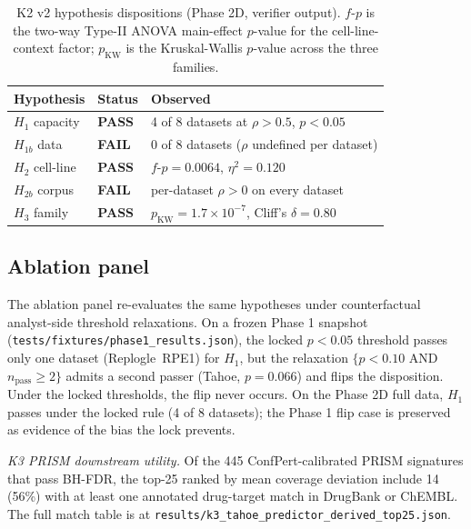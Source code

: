 \documentclass[11pt]{article}
\begin{document}
\begin{table}[h]
\centering
\caption{K2 v2 hypothesis dispositions (Phase 2D, verifier output).
$f$-$p$ is the two-way Type-II ANOVA main-effect $p$-value for the
cell-line-context factor; $p_\text{KW}$ is the Kruskal-Wallis $p$-value
across the three families.}
\label{tab:disp}
\begin{tabular}{lll}
\toprule
Hypothesis & Status & Observed \\
\midrule
$H_1$ capacity & \textbf{PASS} & 4 of 8 datasets at $\rho > 0.5$, $p < 0.05$ \\
$H_{1b}$ data & \textbf{FAIL} & 0 of 8 datasets ($\rho$ undefined per dataset) \\
$H_2$ cell-line & \textbf{PASS} & $f$-$p = 0.0064$, $\eta^2 = 0.120$ \\
$H_{2b}$ corpus & \textbf{FAIL} & per-dataset $\rho > 0$ on every dataset \\
$H_3$ family & \textbf{PASS} & $p_\text{KW} = 1.7\!\times\!10^{-7}$, Cliff's $\delta = 0.80$ \\
\bottomrule
\end{tabular}
\end{table}

\subsection{Ablation panel}
The ablation panel re-evaluates the same hypotheses under counterfactual
analyst-side threshold relaxations. On a frozen Phase 1 snapshot
(\texttt{tests/fixtures/phase1\_results.json}), the locked
$p < 0.05$ threshold passes only one dataset (Replogle~RPE1) for
$H_1$, but the relaxation $\{p < 0.10$ AND $n_\text{pass} \geq 2\}$
admits a second passer (Tahoe, $p = 0.066$) and flips the disposition.
Under the locked thresholds, the flip never occurs. On the Phase 2D
full data, $H_1$ passes under the locked rule (4 of 8 datasets); the
Phase 1 flip case is preserved as evidence of the bias the lock
prevents.

\noindent\emph{K3 PRISM downstream utility.}
Of the 445 ConfPert-calibrated PRISM signatures \cite{corsello2020prism}
that pass BH-FDR, the top-25 ranked by mean coverage deviation include
14 (56\%) with at least one annotated drug-target match in DrugBank or
ChEMBL. The full match table is at
\texttt{results/k3\_tahoe\_predictor\_derived\_top25.json}.

\end{document}

